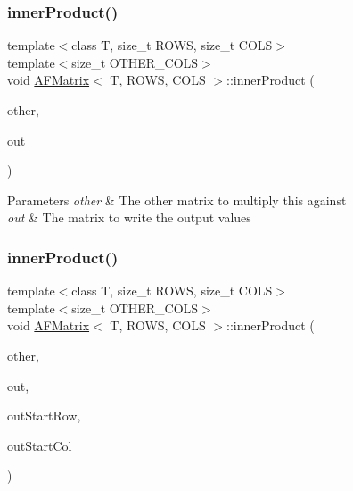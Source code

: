 \subsubsection{\texorpdfstring{inner\+Product()}{innerProduct()}\hspace{0.1cm}{\footnotesize\ttfamily [1/4]}}
{\footnotesize\ttfamily template$<$class T, size\+\_\+t R\+O\+WS, size\+\_\+t C\+O\+LS$>$ \\
template$<$size\+\_\+t O\+T\+H\+E\+R\+\_\+\+C\+O\+LS$>$ \\
void \hyperlink{class_a_f_matrix}{A\+F\+Matrix}$<$ T, R\+O\+WS, C\+O\+LS $>$\+::inner\+Product (\begin{DoxyParamCaption}\item[{\hyperlink{class_a_f_matrix}{A\+F\+Matrix}$<$ T, C\+O\+LS, O\+T\+H\+E\+R\+\_\+\+C\+O\+LS $>$ $\ast$}]{other,  }\item[{\hyperlink{class_a_f_matrix}{A\+F\+Matrix}$<$ T, R\+O\+WS, O\+T\+H\+E\+R\+\_\+\+C\+O\+LS $>$ $\ast$}]{out }\end{DoxyParamCaption})\hspace{0.3cm}{\ttfamily [inline]}}


\begin{DoxyParams}{Parameters}
{\em other} & The other matrix to multiply this against \\
\hline
{\em out} & The matrix to write the output values \\
\hline
\end{DoxyParams}
\mbox{\label{class_a_f_matrix_a735c5a51f49427b88555d718b9055b1b}} 
\subsubsection{\texorpdfstring{inner\+Product()}{innerProduct()}\hspace{0.1cm}{\footnotesize\ttfamily [2/4]}}
{\footnotesize\ttfamily template$<$class T, size\+\_\+t R\+O\+WS, size\+\_\+t C\+O\+LS$>$ \\
template$<$size\+\_\+t O\+T\+H\+E\+R\+\_\+\+C\+O\+LS$>$ \\
void \hyperlink{class_a_f_matrix}{A\+F\+Matrix}$<$ T, R\+O\+WS, C\+O\+LS $>$\+::inner\+Product (\begin{DoxyParamCaption}\item[{\hyperlink{class_a_f_matrix}{A\+F\+Matrix}$<$ T, C\+O\+LS, O\+T\+H\+E\+R\+\_\+\+C\+O\+LS $>$ $\ast$}]{other,  }\item[{\hyperlink{class_a_f_matrix}{A\+F\+Matrix}$<$ T, R\+O\+WS, O\+T\+H\+E\+R\+\_\+\+C\+O\+LS $>$ $\ast$}]{out,  }\item[{size\+\_\+t}]{out\+Start\+Row,  }\item[{size\+\_\+t}]{out\+Start\+Col }\end{DoxyParamCaption})\hspace{0.3cm}{\ttfamily [inline]}}


